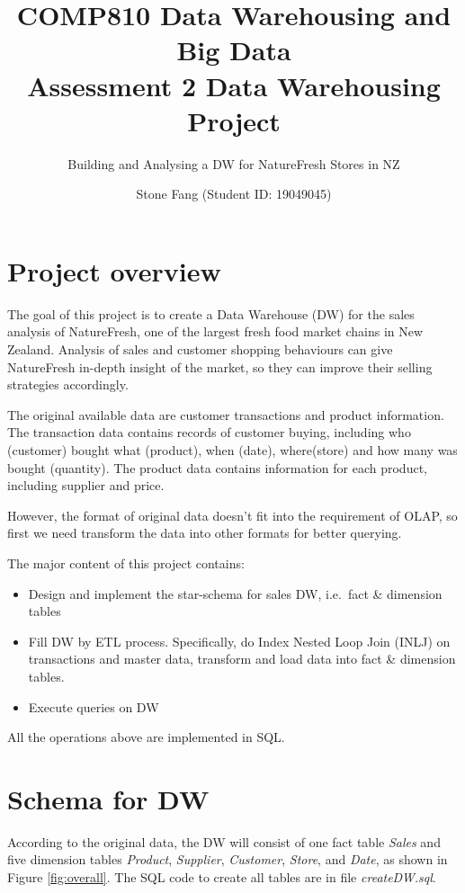 \documentclass[
  12pt,
  a4paper,
]{article}
\title{COMP810 Data Warehousing and Big Data\\
Assessment 2 Data Warehousing Project}
\subtitle{Building and Analysing a DW for NatureFresh Stores in NZ}
\author{Stone Fang (Student ID: 19049045)}
\date{}
\providecommand{\tightlist}{%
  \setlength{\itemsep}{0pt}\setlength{\parskip}{0pt}}
\begin{document}
\maketitle

\hypertarget{project-overview}{%
\section{Project overview}\label{project-overview}}

The goal of this project is to create a Data Warehouse (DW) for the
sales analysis of NatureFresh, one of the largest fresh food market
chains in New Zealand. Analysis of sales and customer shopping
behaviours can give NatureFresh in-depth insight of the market, so they
can improve their selling strategies accordingly.

The original available data are customer transactions and product
information. The transaction data contains records of customer buying,
including who (customer) bought what (product), when (date),
where(store) and how many was bought (quantity). The product data
contains information for each product, including supplier and price.

However, the format of original data doesn't fit into the requirement of
OLAP, so first we need transform the data into other formats for better
querying.

The major content of this project contains:

\begin{itemize}
\tightlist
\item
  Design and implement the star-schema for sales DW, i.e.~fact \&
  dimension tables
\item
  Fill DW by ETL process. Specifically, do Index Nested Loop Join (INLJ)
  on transactions and master data, transform and load data into fact \&
  dimension tables.
\item
  Execute queries on DW
\end{itemize}

All the operations above are implemented in SQL.

\hypertarget{schema-for-dw}{%
\section{Schema for DW}\label{schema-for-dw}}

According to the original data, the DW will consist of one fact table
\emph{Sales} and five dimension tables \emph{Product}, \emph{Supplier},
\emph{Customer}, \emph{Store}, and \emph{Date}, as shown in Figure
\ref{fig:overall}. The SQL code to create all tables are in file
\emph{createDW.sql}.
\end{document}
